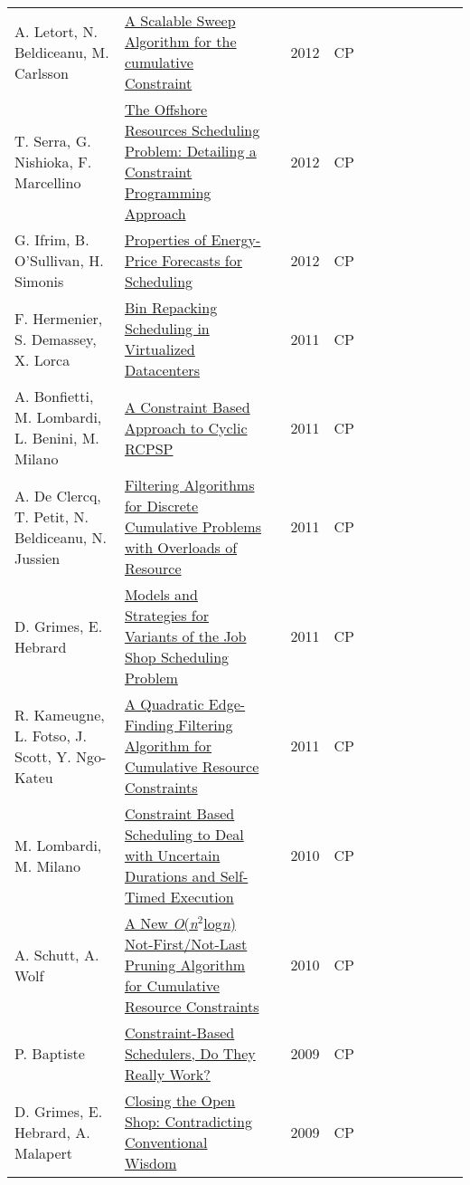 {\begin{longtable}{p{3cm}p{6cm}rrcrlcccp{1.5cm}l}
A. Letort, N. Beldiceanu, M. Carlsson& \href{papers/LetortBC12.pdf}{A Scalable Sweep Algorithm for the cumulative Constraint} & \cite{LetortBC12} & 2012 & CP & & & & & & & \\
T. Serra, G. Nishioka, F. Marcellino& \href{papers/SerraNM12.pdf}{The Offshore Resources Scheduling Problem: Detailing a Constraint Programming Approach} & \cite{SerraNM12} & 2012 & CP & & & & & & & \\
G. Ifrim, B. O'Sullivan, H. Simonis& \href{papers/IfrimOS12.pdf}{Properties of Energy-Price Forecasts for Scheduling} & \cite{IfrimOS12} & 2012 & CP & & & & & & & \\
F. Hermenier, S. Demassey, X. Lorca& \href{papers/HermenierDL11.pdf}{Bin Repacking Scheduling in Virtualized Datacenters} & \cite{HermenierDL11} & 2011 & CP & & & & & & & \\
A. Bonfietti, M. Lombardi, L. Benini, M. Milano& \href{papers/BonfiettiLBM11.pdf}{A Constraint Based Approach to Cyclic {RCPSP}} & \cite{BonfiettiLBM11} & 2011 & CP & & & & & & & \\
A. De Clercq, T. Petit, N. Beldiceanu, N. Jussien& \href{papers/ClercqPBJ11.pdf}{Filtering Algorithms for Discrete Cumulative Problems with Overloads of Resource} & \cite{ClercqPBJ11} & 2011 & CP & & & & & & & \\
D. Grimes, E. Hebrard& \href{papers/GrimesH11.pdf}{Models and Strategies for Variants of the Job Shop Scheduling Problem} & \cite{GrimesH11} & 2011 & CP & & & & & & & \\
R. Kameugne, L. Fotso, J. Scott, Y. Ngo{-}Kateu& \href{papers/KameugneFSN11.pdf}{A Quadratic Edge-Finding Filtering Algorithm for Cumulative Resource Constraints} & \cite{KameugneFSN11} & 2011 & CP & & & & & & & \\
M. Lombardi, M. Milano& \href{papers/LombardiM10.pdf}{Constraint Based Scheduling to Deal with Uncertain Durations and Self-Timed Execution} & \cite{LombardiM10} & 2010 & CP & & & & & & & \\
A. Schutt, A. Wolf& \href{papers/SchuttW10.pdf}{A New \emph{O}(\emph{n}\({}^{\mbox{2}}\)log\emph{n}) Not-First/Not-Last Pruning Algorithm for Cumulative Resource Constraints} & \cite{SchuttW10} & 2010 & CP & & & & & & & \\
P. Baptiste& \href{papers/Baptiste09.pdf}{Constraint-Based Schedulers, Do They Really Work?} & \cite{Baptiste09} & 2009 & CP & & & & & & & \\
D. Grimes, E. Hebrard, A. Malapert& \href{papers/GrimesHM09.pdf}{Closing the Open Shop: Contradicting Conventional Wisdom} & \cite{GrimesHM09} & 2009 & CP & & & & & & & \\

\end{longtable}}
